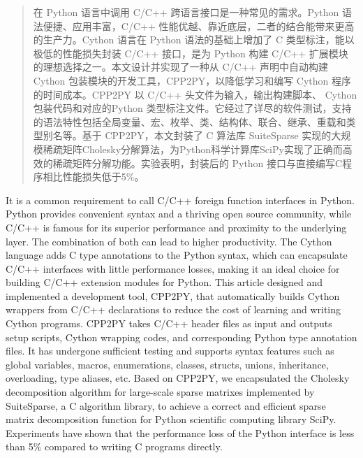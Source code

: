 

\begin{abstract}
在 Python 语言中调用 C/C++ 跨语言接口是一种常见的需求。Python 语法便捷、应用丰富，C/C++ 性能优越、靠近底层，二者的结合能带来更高的生产力。Cython 语言在 Python 语法的基础上增加了 C 类型标注，能以极低的性能损失封装 C/C++ 接口，是为 Python 构建 C/C++ 扩展模块的理想选择之一。本文设计并实现了一种从 C/C++ 声明中自动构建 Cython 包装模块的开发工具，CPP2PY，以降低学习和编写 Cython 程序的时间成本。CPP2PY 以 C/C++ 头文件为输入，输出构建脚本、 Cython 包装代码和对应的Python 类型标注文件。它经过了详尽的软件测试，支持的语法特性包括全局变量、宏、枚举、类、结构体、联合、继承、重载和类型别名等。基于 CPP2PY，本文封装了 C 算法库 SuiteSparse 实现的大规模稀疏矩阵Cholesky分解算法，为Python科学计算库SciPy实现了正确而高效的稀疏矩阵分解功能。实验表明，封装后的 Python 接口与直接编写C程序相比性能损失低于5\%。

\end{abstract}

\begin{abstract*}
It is a common requirement to call C/C++ foreign function interfaces in Python.
Python provides convenient syntax and a thriving open source community, while C/C++
is famous for its superior performance and proximity to the underlying layer. The combination of both can lead to higher productivity. The Cython language adds C type annotations to the Python syntax, which can encapsulate C/C++ interfaces with little performance losses, making it an ideal choice for building C/C++ extension modules for Python. This article designed and implemented a development tool, CPP2PY, that automatically builds Cython wrappers from C/C++ declarations to reduce the cost of learning and writing Cython programs. CPP2PY takes C/C++ header files as input and outputs setup scripts, Cython wrapping codes, and corresponding Python type annotation files. It has undergone sufficient testing and supports syntax features such as global variables, macros, enumerations, classes, structs, unions, inheritance, overloading, type aliases, etc. Based on CPP2PY, we encapsulated the Cholesky decomposition algorithm for large-scale sparse matrixes implemented by SuiteSparse, a C algorithm library, to achieve a correct and efficient sparse matrix decomposition function for Python scientific computing library SciPy. Experiments have shown that the performance loss of the Python interface is less
than 5\% compared to writing C programs directly.

\end{abstract*}
